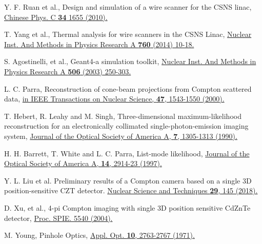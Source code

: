 \documentclass[a4paper,11pt]{article}
\begin{document}
\begin{thebibliography}{90}
 Y. F. Ruan et al., Design and simulation of a wire scanner for the CSNS linac, \href{https://iopscience.iop.org/article/10.1088/1674-1137/34/10/020/meta}{\color {blue}Chinese Phys. C {\bf 34} 1655 (2010).}

 T. Yang et al., Thermal analysis for wire scanners in the CSNS Linac, \href{https://www.sciencedirect.com/science/article/pii/S0168900214006019?via\%3Dihub}{\color {blue}Nuclear Inst. And Methods in Physics Research A {\bf 760} (2014) 10-18.}


 S. Agostinelli, et al., Geant4-a simulation toolkit, \href{https://www.sciencedirect.com/science/article/pii/S0168900203013688}{\color {blue}Nuclear Inst. And Methods in Physics Research A {\bf 506} (2003) 250-303.}


 L. C. Parra, Reconstruction of cone-beam projections from Compton scattered data,  \href{doi: 10.1109/23.873014}{\color {blue} in IEEE Transactions on Nuclear Science, {\bf47}, 1543-1550 (2000).}

 T. Hebert, R. Leahy and M. Singh, Three-dimensional maximum-likelihood reconstruction for an electronically collimated single-photon-emission imaging system, \href{https://doi.org/10.1364/JOSAA.7.001305}{\color {blue} Journal of the Optical Society of America A, {\bf7}, 1305-1313 (1990).}

 H. H. Barrett, T. White and L. C. Parra, List-mode likelihood, \href{https://pubmed.ncbi.nlm.nih.gov/9379247/}{\color {blue}Journal of the Optical Society of America A, {\bf14}, 2914-23 (1997). }
 

 Y. L. Liu et al. Preliminary results of a Compton camera based on a single 3D position-sensitive CZT detector. \href{https://doi.org/10.1007/s41365-018-0483-0}{\color {blue} Nuclear Science and Techniques {\bf 29}, 145 (2018). }


D. Xu, et al., 4-pi Compton imaging with single 3D position sensitive CdZnTe detector, \href{https://ui.adsabs.harvard.edu/abs/2004SPIE.5540..144X/abstract}{\color {blue}Proc. SPIE. 5540 (2004).}%



 M. Young, Pinhole Optics, \href{https://doi.org/10.1364/AO.10.002763}{\color {blue} Appl. Opt. {\bf 10}, 2763-2767 (1971).}


\end{thebibliography}
\end{document}
